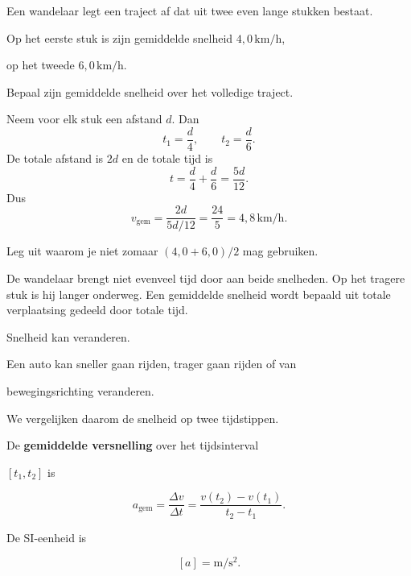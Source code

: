 \documentclass{ximera}
\begin{document}
\begin{oefening}{\oefU\ESS}

Een wandelaar legt een traject af dat uit twee even lange stukken bestaat.

Op het eerste stuk is zijn gemiddelde snelheid $4,0\,\mathrm{km/h}$,

op het tweede $6,0\,\mathrm{km/h}$.

\begin{question}

Bepaal zijn gemiddelde snelheid over het volledige traject.

\begin{oplossing}
Neem voor elk stuk een afstand \(d\). Dan
\[t_1=\frac d4,\qquad t_2=\frac d6.\]
De totale afstand is \(2d\) en de totale tijd is
\[t=\frac d4+\frac d6=\frac{5d}{12}.\]
Dus
\[v_{\mathrm{gem}}=\frac{2d}{5d/12}=\frac{24}{5}=4,8\,\mathrm{km/h}.\]
\end{oplossing}

\end{question}

\begin{question}

Leg uit waarom je niet zomaar $(4,0+6,0)/2$ mag gebruiken.

\begin{oplossing}
De wandelaar brengt niet evenveel tijd door aan beide snelheden. Op het tragere stuk is hij langer onderweg. Een gemiddelde snelheid wordt bepaald uit totale verplaatsing gedeeld door totale tijd.
\end{oplossing}

\end{question}

\end{oefening}





Snelheid kan veranderen.

Een auto kan sneller gaan rijden, trager gaan rijden of van

bewegingsrichting veranderen.

We vergelijken daarom de snelheid op twee tijdstippen.

\begin{definitie}

De \textbf{gemiddelde versnelling} over het tijdsinterval

$[t_1,t_2]$ is

\[\boxed{ a_{\mathrm{gem}} = \frac{\Delta v}{\Delta t} = \frac{v(t_2)-v(t_1)}{t_2-t_1}. }\]

De SI-eenheid is

\[[a]=\mathrm{m/s^2}.\]

\end{definitie}
\end{document}
